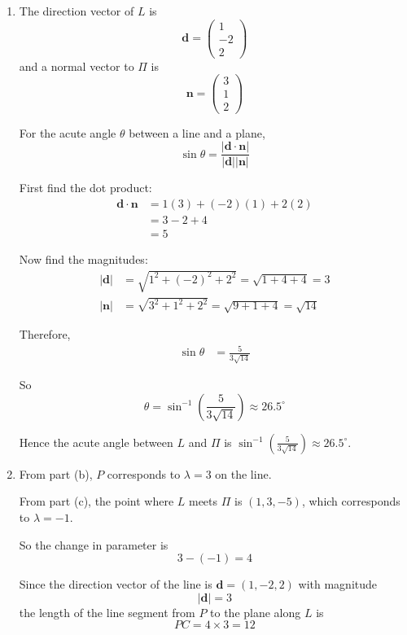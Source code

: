 \documentclass[leqno]{article}
\begin{document}
\begin{enumerate}[
  label=\textbf{\arabic*.},
  leftmargin=*,
  topsep=0pt,
  partopsep=0pt,
  parsep=0pt
]
\begin{tcolorbox}[colback=white, colframe=scarlet, title={\textbf{Solution}}, breakable, grow to left by=6mm, grow to right by=10mm]
\begin{enumerate}[label=\textbf{(\alph*)}]
  \item The direction vector of $L$ is
\[
\mathbf d=\begin{pmatrix}1\\-2\\2\end{pmatrix}
\]
and a normal vector to $\Pi$ is
\[
\mathbf n=\begin{pmatrix}3\\1\\2\end{pmatrix}
\]

For the acute angle $\theta$ between a line and a plane,
\[
\sin\theta=\frac{\left\lvert \mathbf d\cdot\mathbf n\right\rvert}{\left\lvert \mathbf d\right\rvert\left\lvert \mathbf n\right\rvert}
\]

First find the dot product:
\begin{align*}
\mathbf d\cdot\mathbf n
&=1(3)+(-2)(1)+2(2)\\
&=3-2+4\\
&=5
\end{align*}

Now find the magnitudes:
\begin{align*}
\left\lvert \mathbf d\right\rvert
&=\sqrt{1^2+(-2)^2+2^2}
=\sqrt{1+4+4}
=3\\
\left\lvert \mathbf n\right\rvert
&=\sqrt{3^2+1^2+2^2}
=\sqrt{9+1+4}
=\sqrt{14}
\end{align*}

Therefore,
\begin{align*}
\sin\theta
&=\frac{5}{3\sqrt{14}}
\end{align*}

So
\[
\theta=\sin^{-1}\!\left(\frac{5}{3\sqrt{14}}\right)\approx 26.5^\circ
\]

Hence the acute angle between $L$ and $\Pi$ is $\displaystyle \sin^{-1}\!\left(\frac{5}{3\sqrt{14}}\right)\approx 26.5^\circ$.

  \item From part (b), $P$ corresponds to $\lambda=3$ on the line.

From part (c), the point where $L$ meets $\Pi$ is $(1,3,-5)$, which corresponds to $\lambda=-1$.

So the change in parameter is
\[
3-(-1)=4
\]

Since the direction vector of the line is $\mathbf d=(1,-2,2)$ with magnitude
\[
\left\lvert \mathbf d\right\rvert=3
\]
the length of the line segment from $P$ to the plane along $L$ is
\[
PC=4\times 3=12
\]


\end{enumerate}
\end{tcolorbox}
\end{enumerate}
\end{document}
